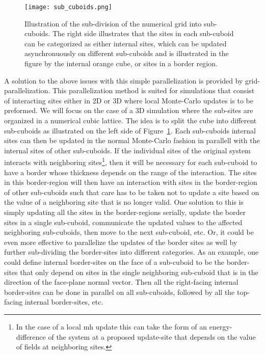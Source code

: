 \begin{figure}[t]
    \centering
    \texttt{[image: sub\_cuboids.png]}
    \caption{Illustration of the sub-division of the numerical grid into sub-cuboids. The right side illustrates that the sites in each sub-cuboid
    can be categorized as either internal sites, which can be updated asynchronuously on different sub-cuboids and is illustrated in the figure
    by the internal orange cube, or sites in a border region.}
    \label{fig:Monte:numerical_grid}
\end{figure}

A solution to the above issues with this simple parallelization is provided by grid-parallelization. This parallelization method is suited for
simulations that consist of interacting sites either in $2$D or $3$D where local Monte-Carlo updates is to be preformed.
We will focus on the case of a $3$D simulation where the sub-sites
are organized in a numerical cubic lattice. The idea is to split the cube into different sub-cuboids as illustrated on the left side of
Figure~\ref{fig:Monte:numerical_grid}. Each sub-cuboids internal sites can then
be updated in the normal Monte-Carlo fashion in parallell with the internal sites of other sub-cuboids. If the individual sites of the original
system interacts with neighboring sites\footnote{In the case of a local \ac{mh} update this can take the form of an energy-difference of
the system at a proposed update-site that depends on the value of fields at neighboring sites.}, then it will be necessary for each sub-cuboid to have
a border whose thickness depends on the range of the interaction. The sites in this border-region will then have an interaction with sites in
the border-region of other sub-cuboids such that care has to be taken not to update a site based on the value of a neighboring site that is no
longer valid. One solution to this is simply updating all the sites in the border-regions serially, \ie update the border sites in a single sub-cuboid,
communicate the updated values to the affected neighboring sub-cuboids, then move to the next sub-cuboid, etc. Or, it could be even more effective
to parallelize the updates of the border sites as well by further sub-dividing the border-sites into different categories. As an example, one could
define internal border-sites on the face of a sub-cuboid to be the border-sites that only depend on sites in the single neighboring sub-cuboid that
is in the direction of the face-plane normal vector. Then all the right-facing internal border-sites can be done in parallel on all sub-cuboids, followed
by all the top-facing internal border-sites, etc.

